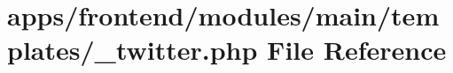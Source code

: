 \hypertarget{frontend_2modules_2main_2templates_2__twitter_8php}{\section{apps/frontend/modules/main/templates/\-\_\-twitter.php File Reference}
\label{frontend_2modules_2main_2templates_2__twitter_8php}
}
